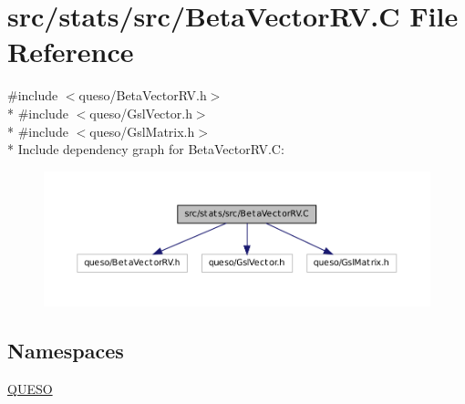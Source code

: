 \hypertarget{_beta_vector_r_v_8_c}{\section{src/stats/src/\-Beta\-Vector\-R\-V.C File Reference}
\label{_beta_vector_r_v_8_c}
}
{\ttfamily \#include $<$queso/\-Beta\-Vector\-R\-V.\-h$>$}\\*
{\ttfamily \#include $<$queso/\-Gsl\-Vector.\-h$>$}\\*
{\ttfamily \#include $<$queso/\-Gsl\-Matrix.\-h$>$}\\*
Include dependency graph for Beta\-Vector\-R\-V.\-C\-:
\nopagebreak
\begin{figure}[H]
\begin{center}
\leavevmode
\includegraphics[width=350pt]{_beta_vector_r_v_8_c__incl}
\end{center}
\end{figure}
\subsection*{Namespaces}
\begin{DoxyCompactItemize}
\item 
\hyperlink{namespace_q_u_e_s_o}{Q\-U\-E\-S\-O}
\end{DoxyCompactItemize}

